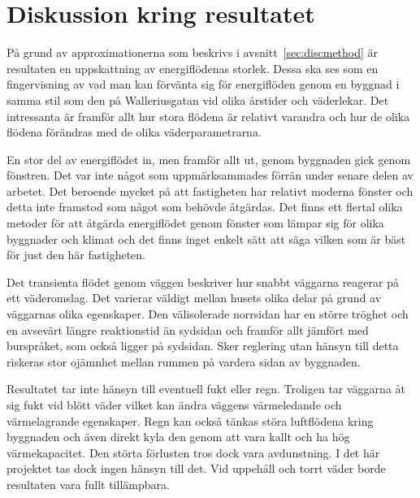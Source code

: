 \section{Diskussion kring resultatet}


På grund av approximationerna som beskrivs i avsnitt~\ref{sec:discmethod} är resultaten en uppskattning av energiflödenas storlek. Dessa ska ses som en fingervisning av vad man kan förvänta sig för energiflöden genom en byggnad i samma stil som den på Walleriusgatan vid olika årstider och väderlekar. Det intressanta är framför allt hur stora flödena är relativt varandra och hur de olika flödena förändras med de olika väderparametrarna.

En stor del av energiflödet in, men framför allt ut, genom byggnaden gick genom fönstren. Det var inte något som uppmärksammades förrän under senare delen av arbetet. Det beroende mycket på att fastigheten har relativt moderna fönster och detta inte framstod som något som behövde åtgärdas. Det finns ett flertal olika metoder för att åtgärda energiflödet genom fönster som lämpar sig för olika byggnader och klimat och det finns inget enkelt sätt att säga vilken som är bäst för just den här fastigheten.

Det transienta flödet genom väggen beskriver hur snabbt väggarna reagerar på ett väderomslag. Det varierar väldigt mellan husets olika delar på grund av väggarnas olika egenskaper. Den välisolerade norrsidan har en större tröghet och en avsevärt längre reaktionstid än sydsidan och framför allt jämfört med burspråket, som också ligger på sydsidan. Sker reglering utan hänsyn till detta riskeras stor ojämnhet mellan rummen på vardera sidan av byggnaden.

Resultatet tar inte hänsyn till eventuell fukt eller regn. Troligen tar väggarna åt sig fukt vid blött väder vilket kan ändra väggens värmeledande och värmelagrande egenskaper. Regn kan också tänkas störa luftflödena kring byggnaden och även direkt kyla den genom att vara kallt och ha hög värmekapacitet. Den störta förlusten tros dock vara avdunstning. I det här projektet tas dock ingen hänsyn till det. Vid uppehåll och torrt väder borde resultaten vara fullt tillämpbara.

